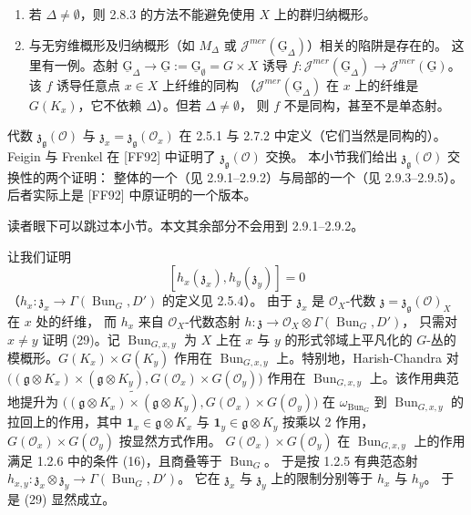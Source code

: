\begin{enumerate}[label=(\roman*),leftmargin=2.6em]
\item 若 $\Delta\neq\emptyset$，则 2.8.3 的方法不能避免使用 $X$ 上的群归纳概形。
\item 与无穷维概形及归纳概形（如 $M_\Delta$ 或
  $\mathcal{J}^{mer}(\underline{\mathrm{G}}_\Delta)$）相关的陷阱是存在的。
  这里有一例。态射
  $\underline{\mathrm{G}}_\Delta\to\underline{\mathrm{G}}
  :=\underline{\mathrm{G}}_\emptyset=G\times X$ 诱导
  $f:\mathcal{J}^{mer}(\underline{\mathrm{G}}_\Delta)\to
  \mathcal{J}^{mer}(\underline{\mathrm{G}})$。
  该 $f$ 诱导任意点 $x\in X$ 上纤维的同构
  （$\mathcal{J}^{mer}(\underline{\mathrm{G}}_\Delta)$ 在 $x$ 上的纤维是
  $G(K_x)$，它不依赖 $\Delta$）。但若 $\Delta\neq\emptyset$，
  则 $f$ 不是同构，甚至不是单态射。
\end{enumerate}

代数 $\mathfrak{z}_{\mathfrak{g}}(\mathcal{O})$ 与
$\mathfrak{z}_x=\mathfrak{z}_{\mathfrak{g}}(\mathcal{O}_x)$ 在 2.5.1 与 2.7.2
中定义（它们当然是同构的）。Feigin 与 Frenkel 在 [FF92] 中证明了
$\mathfrak{z}_{\mathfrak{g}}(\mathcal{O})$ 交换。
本小节我们给出 $\mathfrak{z}_{\mathfrak{g}}(\mathcal{O})$ 交换性的两个证明：
整体的一个（见 2.9.1--2.9.2）与局部的一个（见 2.9.3--2.9.5）。
后者实际上是 [FF92] 中原证明的一个版本。


读者眼下可以跳过本小节。本文其余部分不会用到 2.9.1--2.9.2。

 让我们证明
\begin{equation}\tag{29}
  [h_x(\mathfrak{z}_x),h_y(\mathfrak{z}_y)]=0
\end{equation}
（$h_x:\mathfrak{z}_x\to\Gamma(\operatorname{Bun}_G,D')$ 的定义见 2.5.4）。
由于 $\mathfrak{z}_x$ 是 $\mathcal{O}_X$-代数
$\mathfrak{z}=\mathfrak{z}_{\mathfrak{g}}(\mathcal{O})_X$ 在 $x$ 处的纤维，
而 $h_x$ 来自 $\mathcal{O}_X$-代数态射
$h:\mathfrak{z}\to\mathcal{O}_X\otimes\Gamma(\operatorname{Bun}_G,D')$，
只需对 $x\neq y$ 证明 (29)。记 $\operatorname{Bun}_{G,x,y}$ 为 $X$ 上在 $x$ 与 $y$
的形式邻域上平凡化的 $G$-丛的模概形。$G(K_x)\times G(K_y)$ 作用在
$\operatorname{Bun}_{G,x,y}$ 上。特别地，Harish-Chandra 对
$\big((\mathfrak{g}\otimes K_x)\times(\mathfrak{g}\otimes K_y),
G(\mathcal{O}_x)\times G(\mathcal{O}_y)\big)$ 作用在
$\operatorname{Bun}_{G,x,y}$ 上。该作用典范地提升为
$\big(\widetilde{(\mathfrak{g}\otimes K_x)\times(\mathfrak{g}\otimes K_y)},
G(\mathcal{O}_x)\times G(\mathcal{O}_y)\big)$
在 $\omega_{\operatorname{Bun}_G}$ 到 $\operatorname{Bun}_{G,x,y}$
的拉回上的作用，其中 $\mathbf{1}_x\in\mathfrak{g}\otimes K_x$ 与
$\mathbf{1}_y\in\mathfrak{g}\otimes K_y$ 按乘以 2 作用，
$G(\mathcal{O}_x)\times G(\mathcal{O}_y)$ 按显然方式作用。
$G(\mathcal{O}_x)\times G(\mathcal{O}_y)$ 在 $\operatorname{Bun}_{G,x,y}$
上的作用满足 1.2.6 中的条件 (16)，且商叠等于 $\operatorname{Bun}_G$。
于是按 1.2.5 有典范态射
$h_{x,y}:\mathfrak{z}_x\otimes\mathfrak{z}_y\to
\Gamma(\operatorname{Bun}_G,D')$。
它在 $\mathfrak{z}_x$ 与 $\mathfrak{z}_y$ 上的限制分别等于 $h_x$ 与 $h_y$。
于是 (29) 显然成立。

